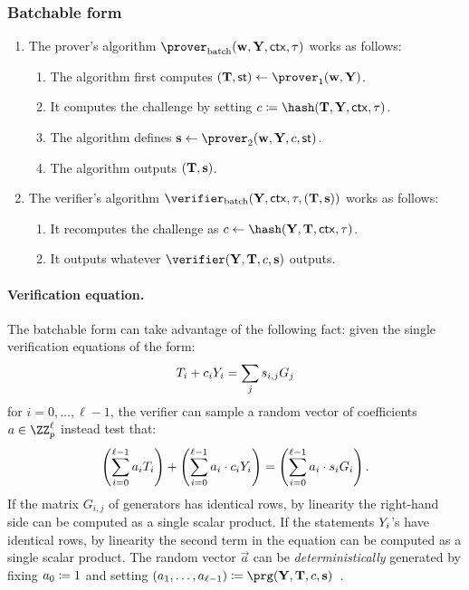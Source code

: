 \documentclass[runningheads]{llncs}
\begin{document}
\subsubsection{Batchable form}


\begin{enumerate}
  \item
    The prover's algorithm $\batchprover(\vec \witness, \vec \statement,\ctx, \stag)$ works as follows:
    \begin{enumerate}
      \item
        The algorithm first computes $(\vec \commitment,\st)\gets\prover_1(\vec \witness, \vec \statement)$.
      \item
        It computes the challenge by setting $c\defeq\hash(\vec \commitment, \vec \statement,\ctx, \stag)$.
      \item
        The algorithm defines $\vec \response\gets\prover_2(\vec \witness, \vec \statement,\challenge,\st)$.
      \item
        The algorithm outputs $(\mathbf {T}, \mathbf {s})$.
    \end{enumerate}
  \item
    The verifier's algorithm $\batchverifier(\vec \statement, \ctx, \stag, (\vec \commitment,\vec s))$ works as follows:
    \begin{enumerate}
      \item
        It recomputes the challenge as $c\gets\hash(\vec \statement, \vec \commitment, \ctx, \stag)$.
      \item
        It outputs whatever $\verifier(\vec \statement,\vec \commitment,\challenge,\vec \response)$ outputs.
    \end{enumerate}
\end{enumerate}


\paragraph{Verification equation.}
The batchable form can take advantage of the following fact:
given the single verification equations of the form:
\[
   T_i + c_i Y_i = \sum_j s_{i, j} G_j
\]
for $i=0, \dots,\ell-1$,
the verifier can sample a random vector of coefficients $a \in \ZZ_p^\ell$ instead test that:
\[
  \left(\sum_{i=0}^{\ell-1} a_i T_i\right) + \left(\sum_{i=0}^{\ell-1} a_i \cdot  c_i Y_i \right) = \left(\sum_{i=0}^{\ell-1} a_i \cdot s_i G_i\right).
\]
If the matrix $G_{i, j}$ of generators has identical rows, by linearity the right-hand side can be computed as a single scalar product.
If the statements $Y_i$'s have identical rows, by linearity the second term in the equation can be computed as a single scalar product.
The random vector $\vec a$ can be \emph{deterministically} generated by fixing $a_0 \coloneqq 1$ and setting $(a_1, \dots, a_{\ell-1}) \defeq \prg(\vec Y, \vec T,  \challenge, \vec s)$~\cite{bip-schnorr}.
\end{document}
